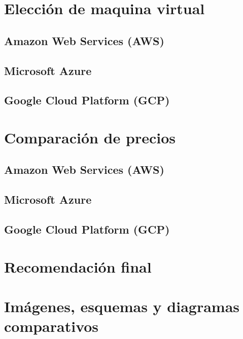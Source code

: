 \documentclass{article}
\begin{document}
\section{Elección de maquina virtual}
  \subsection{Amazon Web Services (AWS)}
  \subsection{Microsoft Azure}
  \subsection{Google Cloud Platform (GCP)}

\section{Comparación de precios}
  \subsection{Amazon Web Services (AWS)}
  \subsection{Microsoft Azure}
  \subsection{Google Cloud Platform (GCP)}

\section{Recomendación final}

\section{Imágenes, esquemas y diagramas comparativos}


\printbibliography
\end{document}
